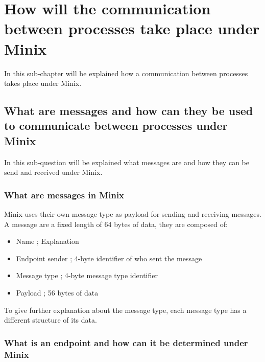\hypertarget{how-will-the-communication-between-processes-take-place-under-minix}{%
\section{How will the communication between processes take place under
Minix}\label{how-will-the-communication-between-processes-take-place-under-minix}}

In this sub-chapter will be explained how a communication between
processes takes place under Minix.

\hypertarget{what-are-messages-and-how-can-they-be-used-to-communicate-between-processes-under-minix}{%
\subsection{What are messages and how can they be used to communicate
between processes under
Minix}\label{what-are-messages-and-how-can-they-be-used-to-communicate-between-processes-under-minix}}

In this sub-question will be explained what messages are and how they
can be send and received under Minix.

\hypertarget{what-are-messages-in-minix}{%
\subsubsection{What are messages in
Minix}\label{what-are-messages-in-minix}}

Minix uses their own message type as payload for sending and receiving
messages. A message are a fixed length of 64 bytes of data, they are
composed of:

\begin{itemize}
\tightlist
\item
  Name ; Explanation
\item
  Endpoint sender ; 4-byte identifier of who sent the message
\item
  Message type ; 4-byte message type identifier
\item
  Payload ; 56 bytes of data
\end{itemize}

To give further explanation about the message type, each message type
has a different structure of its data.

\hypertarget{what-is-an-endpoint-and-how-can-it-be-determined-under-minix}{%
\subsubsection{What is an endpoint and how can it be determined under
Minix}\label{what-is-an-endpoint-and-how-can-it-be-determined-under-minix}}

